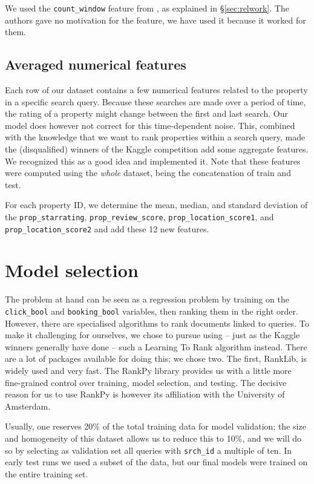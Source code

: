 \documentclass[runningheads,a4paper]{llncs}
\begin{document}
We used the \verb|count_window| feature from \cite{bing}, as explained in \S\ref{sec:relwork}. The authors gave no motivation for the feature, we have used it because it worked for them.

\subsection{Averaged numerical features}
\label{sec:avg}
Each row of our dataset contains a few numerical features related to the property
in a specific search query. Because these searches are made over a period of time,
the rating of a property might change between the first and last search. Our model
does however not correct for this time-dependent noise. This, combined with the 
knowledge that we want to rank properties within a search query,
made the (disqualified) winners of the Kaggle competition add some aggregate features. \cite{kaggle:forums}
We recognized this as a good idea and implemented it. Note that these features were computed using the 
\emph{whole} dataset, being the concatenation of train and test.

For each property ID, we determine the mean, median, and standard deviation of the
\verb|prop_starrating|, \verb|prop_review_score|, \verb|prop_location_score1|, and
\verb|prop_location_score2| and add these 12 new features.

\section{Model selection}
The problem at hand can be seen as a regression problem by training on the \verb|click_bool| and \verb|booking_bool| variables, then ranking them in the right order.  However, there are specialised algorithms to rank documents linked to queries. To make it challenging for ourselves, we chose to pursue using -- just as the Kaggle winners generally have done -- such a Learning To Rank algorithm instead.  There are a lot of packages available for doing this; we chose two. The first, RankLib\cite{ranklib}, is widely used and very fast.  The RankPy\cite{rankpy} library provides us with a little more fine-grained control over training, model selection, and testing. The decisive reason for us to use RankPy is however its affiliation with the University of Amsterdam.

Usually, one reserves 20\% of the total training data for model validation; the size and homogeneity of this dataset allows us to reduce this to 10\%,\cite{bing} and we will do so by selecting as validation set all queries with \verb|srch_id| a multiple of ten.  In early test runs we used a subset of the data, but our final models were trained on the entire training set.
\end{document}
